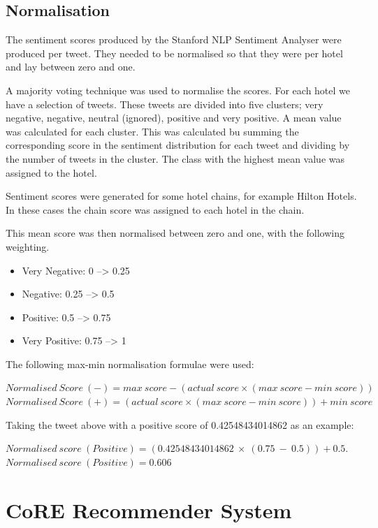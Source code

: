\subsection*{Normalisation}

The sentiment scores produced by the Stanford NLP Sentiment Analyser were produced per tweet. They needed to be normalised so that they were per hotel and lay between zero and one.

A majority voting technique was used to normalise the scores. For each hotel we have a selection of tweets. These tweets are divided into five clusters; very negative, negative, neutral (ignored), positive and very positive. A mean value was calculated for each cluster. This was calculated bu summing the corresponding score in the sentiment distribution for each tweet and dividing by the number of tweets in the cluster. The class with the highest mean value was assigned to the hotel.

Sentiment scores were generated for some hotel chains, for example Hilton Hotels. In these cases the chain score was assigned to each hotel in the chain.

This mean score was then normalised between zero and one, with the following weighting.
\begin{itemize}
    \item Very Negative: 0 --> 0.25
    \item Negative: 0.25 --> 0.5
    \item Positive: 0.5 --> 0.75
    \item Very Positive: 0.75 --> 1
\end{itemize}

The following max-min normalisation formulae were used:

\begin{tcolorbox}[title=Normalisation]
$Normalised\ Score\ (-) = max\ score-(actual\ score \times (max\ score - min\ score))$
$Normalised\ Score\ (+) = (actual\ score \times (max\ score - min\ score)) + min\ score$
\end{tcolorbox}

Taking the tweet above with a positive score of 0.42548434014862 as an example:
\begin{tcolorbox}[title=Example]
$Normalised\ score\ (Positive) = (0.42548434014862\ \times\ (0.75\ -\ 0.5)) + 0.5.$
$Normalised\ score\ (Positive) = 0.606$
\end{tcolorbox}

\section{CoRE Recommender System}

